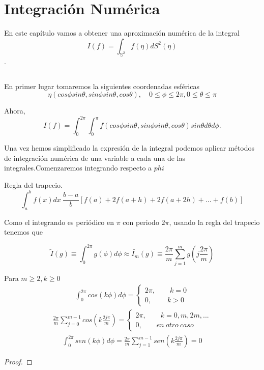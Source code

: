 \chapter[Integración Numérica]{Integración Numérica}
En este capítulo vamos a obtener una aproximación numérica de la integral $$ I(f) = \int_{\mathds{S}^2} f(\eta) dS^2(\eta) $$. 
\section{}
En primer lugar tomaremos la siguientes coordenadas esféricas
$$ \eta (cos\phi sin\theta, sin\phi sin\theta,cos \theta), \quad 0\le \phi \le 2\pi, 0\le \theta \le \pi$$
 
Ahora, 
$$
I(f) = \int_{0}^{2\pi} \int_{0}^{\pi} f(cos\phi sin\theta, sin\phi sin\theta,cos \theta)sin\theta d\theta d\phi. 
$$

Una vez hemos simplificado la expresión de la integral podemos aplicar métodos de integración numérica de una variable a cada una de las integrales.Comenzaremos integrando respecto a $phi$
\medskip
\begin{rem}Regla del trapecio.
	$$\int_{a}^{b} f(x)dx ~ \frac{b-a}{b}\left[f(a)+2f(a+h)+2f(a+2h)+...+f(b)\right]
	$$
\end{rem}

Como el integrando es periódico en $\pi$ con periodo $2\pi$, usando la regla del trapecio tenemos que

$$
\widetilde{I}(g)\equiv \int_{0}^{2\pi} g(\phi)d\phi \approx \widetilde{I_m}(g) \equiv \frac{2\pi}{m} \sum_{j=1}^{m} g(j\frac{2\pi}{m})
$$

\begin{lem} Para $m\ge 2,k\ge 0$
	\begin{gather}
	\int_{0}^{2\pi} cos(k\phi)d\phi = \left\{\begin{array}{ll} 2\pi, \qquad k=0 
											\\ 0 ,  \qquad\  k>0
		\end{array} 
		\right.
	\end{gather}
	\begin{gather}
	\frac{2\pi}{m}\sum_{j=0}^{m-1}cos(k\frac{2j\pi}{m}) = \left\{\begin{array}{ll} 2\pi, \qquad k=0,m,2m,... 
	\\ 0 ,  \qquad en\ otro\ caso
	\end{array} 
	\right.
	\end{gather}
	\begin{gather}
	\int_{0}^{2\pi} sen(k\phi)d\phi =  \frac{2\pi}{m}\sum_{j=1}^{m-1}sen(k\frac{2j\pi}{m}) =0 
	\end{gather}
\end{lem}
\begin{proof}
\end{proof}

